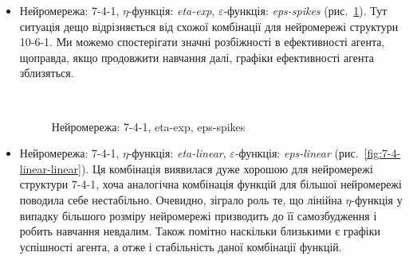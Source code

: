 \documentclass[a4paper,10pt,fleqn]{article}
\begin{document}
\begin{itemize}
\item Нейромережа: 7-4-1, $\eta$-функція: \textit{eta-exp}, $\varepsilon$-функція: \textit{eps-spikes} (рис.~\ref{fig:7-4-exp-spikes}). Тут ситуація дещо відрізняється від схожої комбінації для нейромережі структури 10-6-1. Ми можемо спостерігати значні розбіжності в ефективності агента, щоправда, якщо продовжити навчання далі, графіки ефективності агента зблизяться.

\begin{figure}[h!]
  \centering
  \,
  \,
  \caption{Нейромережа: 7-4-1, eta-exp, eps-spikes}
  \label{fig:7-4-exp-spikes}
\end{figure}

\item Нейромережа: 7-4-1, $\eta$-функція: \textit{eta-linear}, $\varepsilon$-функція: \textit{eps-linear} (рис.~\ref{fig:7-4-linear-linear}). Ця комбінація виявилася дуже хорошою для нейромережі структури 7-4-1, хоча аналогічна комбінація функцій для більшої нейромережі поводила себе нестабільно. Очевидно, зіграло роль те, що лінійна $\eta$-функція у випадку більшого розміру нейромережі призводить до її самозбудження і робить навчання невдалим. Також помітно наскільки близькими є графіки успішності агента, а отже і стабільність даної комбінації функцій. 


\end{itemize}
\end{document}
